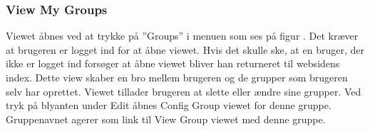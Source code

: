 \subsubsection{View My Groups}
Viewet åbnes ved at trykke på ''Groups'' i menuen som ses på figur . Det kræver at brugeren er logget ind for at åbne viewet. Hvis det skulle ske, at en bruger, der ikke er logget ind forsøger at åbne viewet bliver han returneret til websidens index.
Dette view skaber en bro mellem brugeren og de grupper som brugeren selv har oprettet. Viewet tillader brugeren at slette eller ændre sine grupper. Ved tryk på blyanten under Edit åbnes Config Group viewet for denne gruppe. Gruppenavnet agerer som link til View Group viewet med denne gruppe. 
